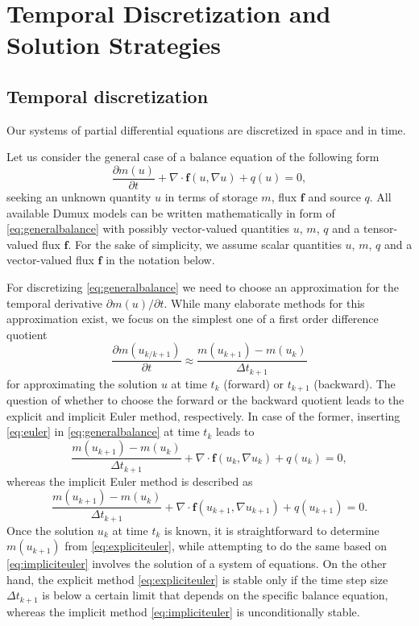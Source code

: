 \section{Temporal Discretization and Solution Strategies}
\subsection{Temporal discretization}

Our systems of partial differential equations are discretized in space and in time.

Let us consider the general case of a balance equation of the following form
\begin{equation}\label{eq:generalbalance}
\frac{\partial m(u)}{\partial t} + \nabla\cdot\mathbf{f}(u, \nabla u) + q(u) = 0,
\end{equation}
seeking an unknown quantity $u$ in terms of storage $m$, flux $\mathbf{f}$ and source $q$.
All available Dumux models can be written mathematically in form of \eqref{eq:generalbalance}
with possibly vector-valued quantities $u$, $m$, $q$ and a tensor-valued flux $\mathbf{f}$.
For the sake of simplicity, we assume scalar quantities $u$, $m$, $q$ and a vector-valued
flux $\mathbf{f}$ in the notation below.

For discretizing \eqref{eq:generalbalance} we need to choose an
approximation for the temporal derivative $\partial m(u)/\partial t$.
While many elaborate methods for this approximation exist,
we focus on the simplest one of a first order difference quotient
\begin{equation}\label{eq:euler}
\frac{\partial m(u_{k/k+1})}{\partial t}
\approx \frac{m(u_{k+1}) - m(u_k)}{\Delta t_{k+1}}
\end{equation}
for approximating the solution $u$ at time $t_k$ (forward) or $t_{k+1}$ (backward).
The question of whether to choose the forward or the backward quotient leads to the
explicit and implicit Euler method, respectively.
In case of the former, inserting \eqref{eq:euler} in \eqref{eq:generalbalance}
at time $t_k$ leads to
\begin{equation}\label{eq:expliciteuler}
\frac{m(u_{k+1}) - m(u_k)}{\Delta t_{k+1}} + \nabla\cdot\mathbf{f}(u_k, \nabla u_k) + q(u_k) = 0,
\end{equation}
whereas the implicit Euler method is described as
\begin{equation}\label{eq:impliciteuler}
\frac{m(u_{k+1}) - m(u_k)}{\Delta t_{k+1}}
+ \nabla\cdot\mathbf{f}(u_{k+1}, \nabla u_{k+1}) + q(u_{k+1}) = 0.
\end{equation}
Once the solution $u_k$ at time $t_k$ is known, it is straightforward
to determine $m(u_{k+1})$ from \eqref{eq:expliciteuler},
while attempting to do the same based on \eqref{eq:impliciteuler}
involves the solution of a system of equations.
On the other hand, the explicit method \eqref{eq:expliciteuler} is stable only
if the time step size $\Delta t_{k+1}$ is below a certain limit that depends
on the specific balance equation, whereas the implicit method \eqref{eq:impliciteuler}
is unconditionally stable.

